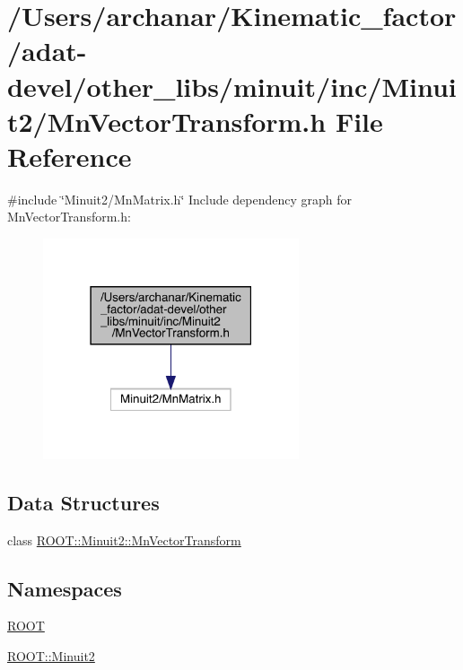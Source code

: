 \hypertarget{adat-devel_2other__libs_2minuit_2inc_2Minuit2_2MnVectorTransform_8h}{}\section{/\+Users/archanar/\+Kinematic\+\_\+factor/adat-\/devel/other\+\_\+libs/minuit/inc/\+Minuit2/\+Mn\+Vector\+Transform.h File Reference}
\label{adat-devel_2other__libs_2minuit_2inc_2Minuit2_2MnVectorTransform_8h}
{\ttfamily \#include \char`\"{}Minuit2/\+Mn\+Matrix.\+h\char`\"{}}\newline
Include dependency graph for Mn\+Vector\+Transform.\+h\+:
\nopagebreak
\begin{figure}[H]
\begin{center}
\leavevmode
\includegraphics[width=214pt]{d6/d4d/adat-devel_2other__libs_2minuit_2inc_2Minuit2_2MnVectorTransform_8h__incl}
\end{center}
\end{figure}
\subsection*{Data Structures}
\begin{DoxyCompactItemize}
\item 
class \mbox{\hyperlink{classROOT_1_1Minuit2_1_1MnVectorTransform}{R\+O\+O\+T\+::\+Minuit2\+::\+Mn\+Vector\+Transform}}
\end{DoxyCompactItemize}
\subsection*{Namespaces}
\begin{DoxyCompactItemize}
\item 
 \mbox{\hyperlink{namespaceROOT}{R\+O\+OT}}
\item 
 \mbox{\hyperlink{namespaceROOT_1_1Minuit2}{R\+O\+O\+T\+::\+Minuit2}}
\end{DoxyCompactItemize}

